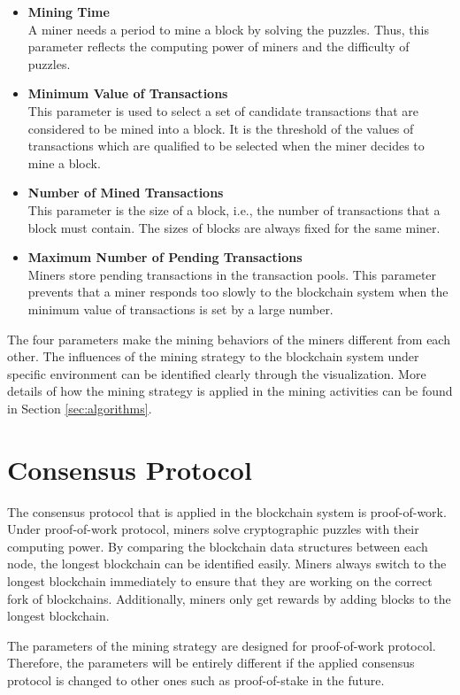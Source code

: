\begin{itemize}
    \item \textbf{Mining Time} \\
        A miner needs a period to mine a block by solving the puzzles. Thus, this parameter reflects the computing power of miners and the difficulty of puzzles.
    \item \textbf{Minimum Value of Transactions} \\
        This parameter is used to select a set of candidate transactions that are considered to be mined into a block. It is the threshold of the values of transactions which are qualified to be selected when the miner decides to mine a block.
    \item \textbf{Number of Mined Transactions} \\
        This parameter is the size of a block, i.e., the number of transactions that a block must contain. The sizes of blocks are always fixed for the same miner.
    \item \textbf{Maximum Number of Pending Transactions} \\
        Miners store pending transactions in the transaction pools. This parameter prevents that a miner responds too slowly to the blockchain system when the minimum value of transactions is set by a large number.
\end{itemize}

The four parameters make the mining behaviors of the miners different from each other. The influences of the mining strategy to the blockchain system under specific environment can be identified clearly through the visualization. More details of how the mining strategy is applied in the mining activities can be found in Section \ref{sec:algorithms}.

\section{Consensus Protocol}

The consensus protocol that is applied in the blockchain system is proof-of-work. Under proof-of-work protocol, miners solve cryptographic puzzles with their computing power. By comparing the blockchain data structures between each node, the longest blockchain can be identified easily. Miners always switch to the longest blockchain immediately to ensure that they are working on the correct fork of blockchains. Additionally, miners only get rewards by adding blocks to the longest blockchain.

The parameters of the mining strategy are designed for proof-of-work protocol. Therefore, the parameters will be entirely different if the applied consensus protocol is changed to other ones such as proof-of-stake in the future.